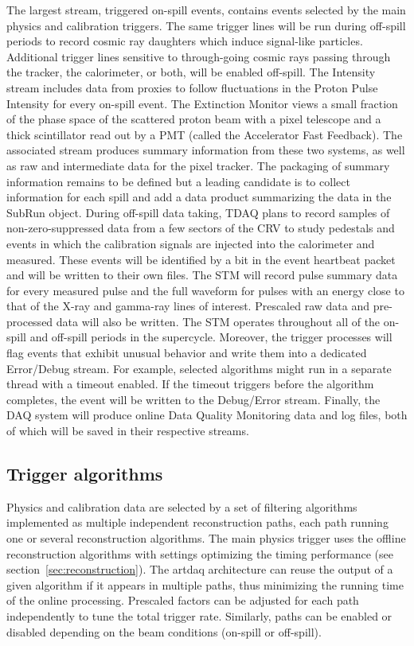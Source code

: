 The largest stream, triggered on-spill events, contains events selected by the main physics and calibration triggers. The same trigger lines will be run during off-spill periods to record cosmic ray daughters which induce signal-like particles. Additional trigger lines sensitive to through-going cosmic rays passing through the tracker, the calorimeter, or both, will be enabled off-spill. The Intensity stream includes data from proxies to follow fluctuations in the Proton Pulse Intensity for every on-spill event. The Extinction Monitor views a small fraction of the phase space of the scattered proton beam with a pixel telescope and a thick scintillator read out by a PMT (called the Accelerator Fast Feedback). The associated stream produces summary information from these two systems, as well as raw and intermediate data for the pixel tracker. The packaging of summary information remains to be defined but a leading candidate is to collect information for each spill and add a data product summarizing the data in the \art SubRun object. During off-spill data taking, TDAQ plans to record samples of non-zero-suppressed data from a few sectors of the CRV to study pedestals and events in which the calibration signals are injected into the calorimeter and measured. These events will be identified by a bit in the event heartbeat packet and will be written to their own files. The STM will record pulse summary data for every measured pulse and the full waveform for pulses with an energy close to that of the X-ray and gamma-ray lines of interest. Prescaled raw data and pre-processed data will also be written. The STM operates throughout all of the on-spill and off-spill periods in the supercycle. Moreover, the trigger processes will flag events that exhibit unusual behavior and write them into a dedicated Error/Debug stream. For example, selected algorithms might run in a separate thread with a timeout enabled. If the timeout triggers before the algorithm completes, the event will be written to the Debug/Error stream. Finally, the DAQ system will produce online Data Quality Monitoring data and log files, both of which will be saved in their respective streams.


\subsection{Trigger algorithms}
Physics and calibration data are selected by a set of filtering algorithms 
implemented as multiple independent reconstruction paths, each path running one or several reconstruction algorithms. The main physics trigger uses the offline reconstruction algorithms with settings optimizing the timing
performance (see section~\ref{sec:reconstruction}). The artdaq architecture can reuse the output of a given algorithm if it appears in multiple paths, thus minimizing the running time of the online processing. Prescaled factors can be adjusted for each path independently to tune the total trigger rate. Similarly, paths can be enabled or disabled depending on the beam conditions (on-spill or off-spill).   


